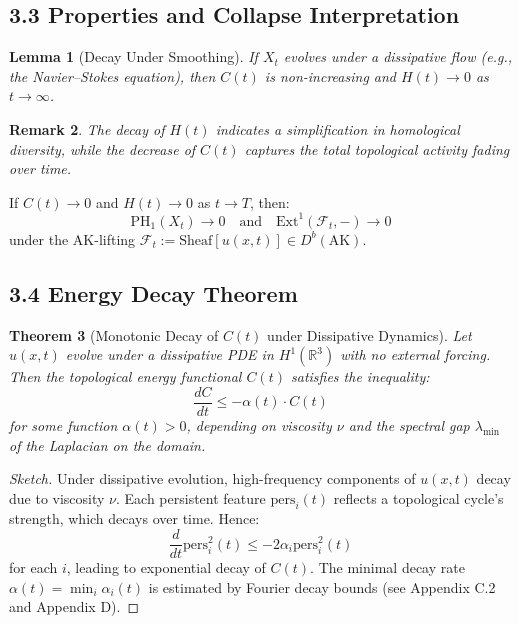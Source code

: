 \documentclass[11pt]{article}
\newtheorem{theorem}{Theorem}[section]
\newtheorem{remark}[theorem]{Remark}
\newtheorem{lemma}[theorem]{Lemma}
\begin{document}
\subsection{3.3 Properties and Collapse Interpretation}

\begin{lemma}[Decay Under Smoothing]
If $X_t$ evolves under a dissipative flow (e.g., the Navier--Stokes equation), then $C(t)$ is non-increasing and $H(t) \to 0$ as $t \to \infty$.
\end{lemma}

\begin{remark}
The decay of $H(t)$ indicates a simplification in homological diversity, while the decrease of $C(t)$ captures the total topological activity fading over time.
\end{remark}

\begin{proposition}
If $C(t) \to 0$ and $H(t) \to 0$ as $t \to T$, then:
\[
\mathrm{PH}_1(X_t) \to 0 \quad \text{and} \quad \mathrm{Ext}^1(\mathcal{F}_t, -) \to 0
\]
under the AK-lifting $\mathcal{F}_t := \mathrm{Sheaf}[u(x,t)] \in D^b(\mathrm{AK})$.
\end{proposition}

\subsection{3.4 Energy Decay Theorem}

\begin{theorem}[Monotonic Decay of $C(t)$ under Dissipative Dynamics]
Let $u(x,t)$ evolve under a dissipative PDE in $H^1(\mathbb{R}^3)$ with no external forcing.  
Then the topological energy functional $C(t)$ satisfies the inequality:
\[
\frac{dC}{dt} \leq -\alpha(t) \cdot C(t)
\]
for some function $\alpha(t) > 0$, depending on viscosity $\nu$ and the spectral gap $\lambda_{\min}$ of the Laplacian on the domain.
\end{theorem}

\begin{proof}[Sketch]
Under dissipative evolution, high-frequency components of $u(x,t)$ decay due to viscosity $\nu$.  
Each persistent feature $\text{pers}_i(t)$ reflects a topological cycle's strength, which decays over time. Hence:
\[
\frac{d}{dt} \mathrm{pers}_i^2(t) \leq -2\alpha_i \mathrm{pers}_i^2(t)
\]
for each $i$, leading to exponential decay of $C(t)$. The minimal decay rate $\alpha(t) = \min_i \alpha_i(t)$ is estimated by Fourier decay bounds (see Appendix C.2 and Appendix D).
\end{proof}
\end{document}
